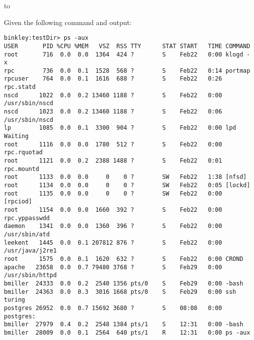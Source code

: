\documentclass[11pt,letter]{exam}
\begin{document}
\begin{center} 
\end{center} 
\lstset{language=Java,numbers=left}

\vspace{0.1in} 
\hbox to \textwidth{Name:\enspace\hrulefill} 


\begin{questions}

\question
Given the following command and output:
\begin{verbatim}
binkley:testDir> ps -aux
USER       PID %CPU %MEM   VSZ  RSS TTY      STAT START   TIME COMMAND
root       716  0.0  0.0  1364  424 ?        S    Feb22   0:00 klogd -x
rpc        736  0.0  0.1  1528  568 ?        S    Feb22   0:14 portmap
rpcuser    764  0.0  0.1  1616  688 ?        S    Feb22   0:26 rpc.statd
nscd      1022  0.0  0.2 13460 1188 ?        S    Feb22   0:00 /usr/sbin/nscd
nscd      1023  0.0  0.2 13460 1188 ?        S    Feb22   0:06 /usr/sbin/nscd
lp        1085  0.0  0.1  3300  904 ?        S    Feb22   0:00 lpd Waiting  
root      1116  0.0  0.0  1780  512 ?        S    Feb22   0:00 rpc.rquotad
root      1121  0.0  0.2  2388 1488 ?        S    Feb22   0:01 rpc.mountd
root      1133  0.0  0.0     0    0 ?        SW   Feb22   1:38 [nfsd]
root      1134  0.0  0.0     0    0 ?        SW   Feb22   0:05 [lockd]
root      1135  0.0  0.0     0    0 ?        SW   Feb22   0:00 [rpciod]
root      1154  0.0  0.0  1660  392 ?        S    Feb22   0:00 rpc.yppasswdd
daemon    1341  0.0  0.0  1360  396 ?        S    Feb22   0:00 /usr/sbin/atd
leekent   1445  0.0  0.1 207812 876 ?        S    Feb22   0:00 /usr/java/j2re1
root      1575  0.0  0.1  1620  632 ?        S    Feb22   0:00 CROND
apache   23658  0.0  0.7 79480 3768 ?        S    Feb29   0:00 /usr/sbin/httpd 
bmiller  24333  0.0  0.2  2540 1356 pts/0    S    Feb29   0:00 -bash
bmiller  24363  0.0  0.3  3016 1668 pts/0    S    Feb29   0:00 ssh turing
postgres 26952  0.0  0.7 15692 3680 ?        S    08:08   0:00 postgres: 
bmiller  27979  0.4  0.2  2548 1384 pts/1    S    12:31   0:00 -bash
bmiller  28009  0.0  0.1  2564  640 pts/1    R    12:31   0:00 ps -aux
\end{verbatim}
\begin{parts}

\end{parts}
\end{questions}
\end{document}
